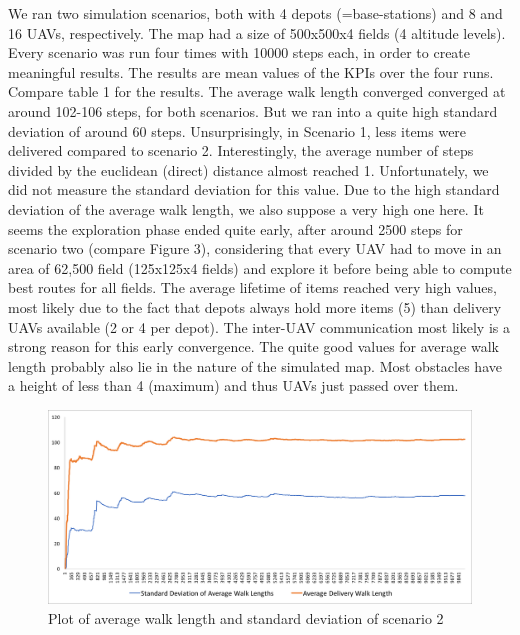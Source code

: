We ran two simulation scenarios, both with 4 depots (=base-stations) and 8 and 16 UAVs, respectively. The map had a size of 500x500x4 fields (4 altitude levels). Every scenario was run four times with 10000 steps each, in order to create meaningful results. The results are mean values of the KPIs over the four runs. Compare table 1 for the results. The average walk length converged converged at around 102-106 steps, for both scenarios. But we ran into a quite high standard deviation of around 60 steps. Unsurprisingly, in Scenario 1, less items were delivered compared to scenario 2. Interestingly, the average number of steps divided by the euclidean (direct) distance almost reached 1. Unfortunately, we did not measure the standard deviation for this value. Due to the high standard deviation of the average walk length, we also suppose a very high one here. It seems the exploration phase ended quite early, after around 2500 steps for scenario two (compare Figure 3), considering that every UAV had to move in an area of 62,500 field (125x125x4 fields) and explore it before being able to compute best routes for all fields. The average lifetime of items reached very high values, most likely due to the fact that depots always hold more items (5) than delivery UAVs available (2 or 4 per depot). The inter-UAV communication most likely is a strong reason for this early convergence. The quite good values for average walk length probably also lie in the nature of the simulated map. Most obstacles have a height of less than 4 (maximum) and thus UAVs just passed over them. \\
 
 \begin{figure}\label{fig:eval}
 \centering
 \includegraphics[width=\textwidth]{images/graph}
 \caption{Plot of average walk length and standard deviation of scenario 2}
 \end{figure}

